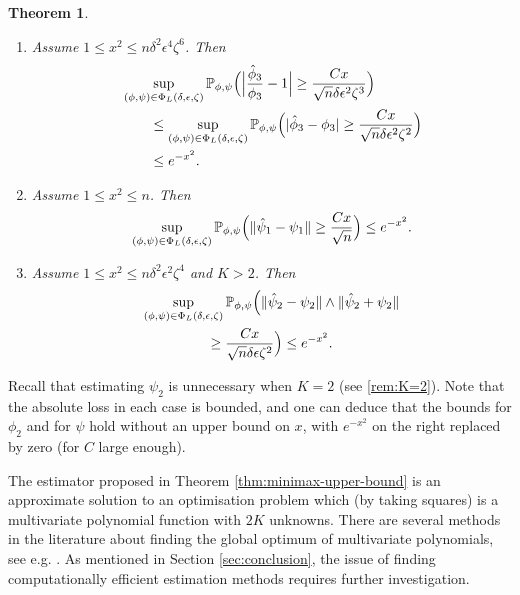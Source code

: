 \documentclass[journal]{IEEEtran}
\newtheorem{theorem}{Theorem}
\newcommand{\1}{\boldsymbol{1}}
\newcommand{\PP}{\mathbb{P}}
\DeclarePairedDelimiter{\brackets}{(}{)}
\DeclarePairedDelimiter{\norm}{\lVert}{\rVert}
\DeclarePairedDelimiter{\abs}{\lvert}{\rvert}
\begin{document}
\begin{theorem}
\begin{enumerate}
                  
                  \item\label{item:mub:phi3} Assume $1\leq x^2\leq n\delta^2\epsilon^4\zeta^6$. Then
                  \begin{align*}
                    &\sup_{(\phi,\psi)\in \Phi_L(\delta,\epsilon,\zeta)} \PP_{\phi,\psi} \brackets[\Big]{ \abs[\Big]{\frac{\hat{\phi}_3}{\phi_3}-1}\geq \frac{Cx}{\sqrt{n}\delta \epsilon^2\zeta^3}}\\%
                    &\qquad\leq \sup_{(\phi,\psi)\in \Phi_L(\delta,\epsilon,\zeta)} \PP_{\phi,\psi} \brackets[\Big]{ \abs{\hat{\phi}_3-\phi_3} \geq \frac{Cx }{\sqrt{n}\delta \epsilon^2\zeta^2}}\\
                    &\qquad\leq e^{-x^2}.
                  \end{align*}

		\item\label{item:mub:psi1} Assume $1\leq x^2\leq n$. Then
			\[ \sup_{(\phi,\psi)\in\Phi_L(\delta,\epsilon,\zeta)} \PP_{\phi,\psi}\brackets[\Big]{\norm{\hat{\psi}_1-\psi_1} \geq \frac{Cx }{\sqrt{n}}}\leq e^{-x^2}.\]

		\item\label{item:mub:psi2}
			Assume $1\leq x^2\leq n\delta^2\epsilon^2\zeta^4$ and $K>2$. Then
                        \begin{multline*}
                          \sup_{(\phi,\psi)\in\Phi_L(\delta,\epsilon,\zeta)} \PP_{\phi,\psi}\brackets[\Big]{\norm{\hat{\psi}_2-\psi_2} \wedge \norm{\hat{\psi}_2+\psi_2}\\\geq \frac{Cx }{\sqrt{n}\delta\epsilon\zeta^2}}
                          \leq e^{-x^2}.
                        \end{multline*}
		\end{enumerate}
	\end{theorem}

Recall that estimating $\psi_2$ is unnecessary when $K=2$ (see \cref{rem:K=2}). Note that the absolute loss in each case is bounded, and one can deduce that the bounds for $\phi_2$ and for $\psi$ hold without an upper bound on $x$, with $e^{-x^2}$ on the right replaced by zero (for $C$ large enough).

The estimator proposed in Theorem \ref{thm:minimax-upper-bound} is an approximate solution to an optimisation problem which (by taking squares) is a multivariate polynomial function with $2K$ unknowns. There are several methods in the literature about finding the global optimum of multivariate polynomials, see e.g. \cite{Glopti}. As mentioned in Section \ref{sec:conclusion}, the issue of finding computationally efficient estimation 
methods requires further investigation.
	
\end{document}
